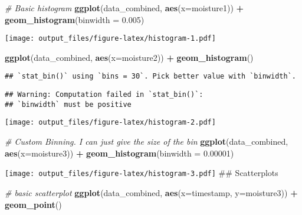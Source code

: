 \documentclass[]{article}
\newenvironment{Shaded}{\begin{snugshade}}{\end{snugshade}}
\newcommand{\KeywordTok}[1]{\textcolor[rgb]{0.13,0.29,0.53}{\textbf{#1}}}
\newcommand{\DataTypeTok}[1]{\textcolor[rgb]{0.13,0.29,0.53}{#1}}
\newcommand{\FloatTok}[1]{\textcolor[rgb]{0.00,0.00,0.81}{#1}}
\newcommand{\StringTok}[1]{\textcolor[rgb]{0.31,0.60,0.02}{#1}}
\newcommand{\CommentTok}[1]{\textcolor[rgb]{0.56,0.35,0.01}{\textit{#1}}}
\newcommand{\OperatorTok}[1]{\textcolor[rgb]{0.81,0.36,0.00}{\textbf{#1}}}
\newcommand{\NormalTok}[1]{#1}
\begin{document}
\begin{Shaded}
\begin{Highlighting}[]
\CommentTok{# Basic histogram}
\KeywordTok{ggplot}\NormalTok{(data_combined, }\KeywordTok{aes}\NormalTok{(}\DataTypeTok{x=}\NormalTok{moisture1)) }\OperatorTok{+}\StringTok{ }\KeywordTok{geom_histogram}\NormalTok{(}\DataTypeTok{binwidth =} \FloatTok{0.005}\NormalTok{)}
\end{Highlighting}
\end{Shaded}

\texttt{[image: output\_files/figure-latex/histogram-1.pdf]}

\begin{Shaded}
\begin{Highlighting}[]
\KeywordTok{ggplot}\NormalTok{(data_combined, }\KeywordTok{aes}\NormalTok{(}\DataTypeTok{x=}\NormalTok{moisture2)) }\OperatorTok{+}\StringTok{ }\KeywordTok{geom_histogram}\NormalTok{()}
\end{Highlighting}
\end{Shaded}

\begin{verbatim}
## `stat_bin()` using `bins = 30`. Pick better value with `binwidth`.
\end{verbatim}

\begin{verbatim}
## Warning: Computation failed in `stat_bin()`:
## `binwidth` must be positive
\end{verbatim}

\texttt{[image: output\_files/figure-latex/histogram-2.pdf]}

\begin{Shaded}
\begin{Highlighting}[]
\CommentTok{# Custom Binning. I can just give the size of the bin}
\KeywordTok{ggplot}\NormalTok{(data_combined, }\KeywordTok{aes}\NormalTok{(}\DataTypeTok{x=}\NormalTok{moisture3)) }\OperatorTok{+}\StringTok{ }\KeywordTok{geom_histogram}\NormalTok{(}\DataTypeTok{binwidth =} \FloatTok{0.00001}\NormalTok{)}
\end{Highlighting}
\end{Shaded}

\texttt{[image: output\_files/figure-latex/histogram-3.pdf]} \#\#
Scatterplots

\begin{Shaded}
\begin{Highlighting}[]
\CommentTok{# basic scatterplot}
\KeywordTok{ggplot}\NormalTok{(data_combined, }\KeywordTok{aes}\NormalTok{(}\DataTypeTok{x=}\NormalTok{timestamp, }\DataTypeTok{y=}\NormalTok{moisture3)) }\OperatorTok{+}\StringTok{ }
\StringTok{  }\KeywordTok{geom_point}\NormalTok{()}
\end{Highlighting}
\end{Shaded}
\end{document}
